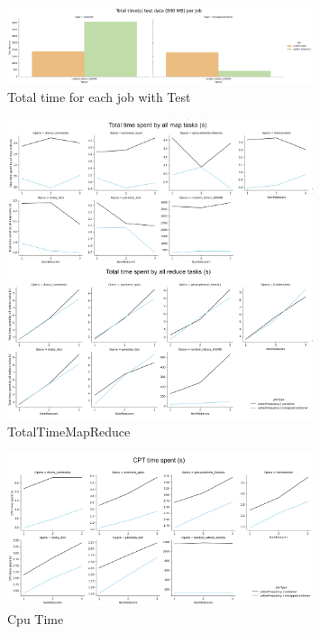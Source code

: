 \begin{figure}[H]
  \centering
  \includegraphics[width=0.8\textwidth]{media/performance/total_time_S_per_job(TEST).png}
  \caption{Total time for each job with Test}
  \label{fig:TimeJobTest}
\end{figure}

\begin{figure}[H]
  \centering
  \includegraphics[width=0.8\textwidth]{media/performance/TotalTimeMapReduce.png}
  \caption{TotalTimeMapReduce}
  \label{fig:TotalTimeMapReduce}
\end{figure}

\begin{figure}[H]
  \centering
  \includegraphics[width=0.8\textwidth]{media/performance/CpuTIME.png}
  \caption{Cpu Time}
  \label{fig:CpuTIME}
\end{figure}

